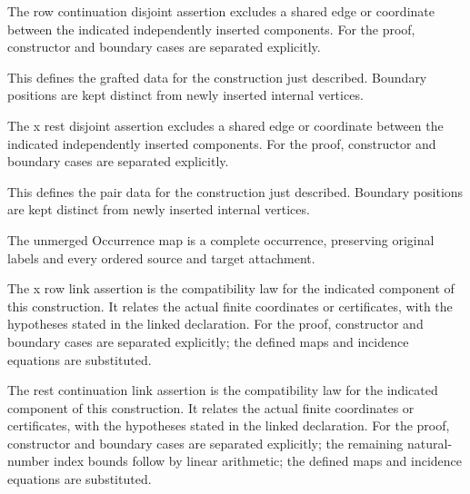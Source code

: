The row continuation disjoint assertion excludes a shared edge or coordinate between the indicated independently inserted components.
For the proof, constructor and boundary cases are separated explicitly.
\par{}

This defines the grafted data for the construction just described. Boundary positions are kept distinct from newly inserted internal vertices.
\par{}

The x rest disjoint assertion excludes a shared edge or coordinate between the indicated independently inserted components.
For the proof, constructor and boundary cases are separated explicitly.
\par{}

This defines the pair data for the construction just described. Boundary positions are kept distinct from newly inserted internal vertices.
\par{}

The unmerged Occurrence map is a complete occurrence, preserving original labels and every ordered source and target attachment.
\par{}

The x row link assertion is the compatibility law for the indicated component of this construction. It relates the actual finite coordinates or certificates, with the hypotheses stated in the linked declaration.
For the proof, constructor and boundary cases are separated explicitly; the defined maps and incidence equations are substituted.
\par{}

The rest continuation link assertion is the compatibility law for the indicated component of this construction. It relates the actual finite coordinates or certificates, with the hypotheses stated in the linked declaration.
For the proof, constructor and boundary cases are separated explicitly; the remaining natural-number index bounds follow by linear arithmetic; the defined maps and incidence equations are substituted.
\par{}

